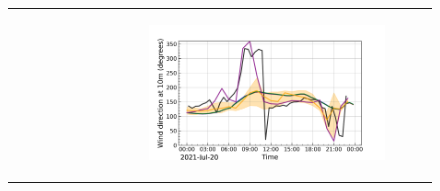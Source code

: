 \begin{figure}[hbtp]
\begin{tabular}{cc}
\begin{subfigure}[t]{0.5\textwidth}
        \end{subfigure} &
        \begin{subfigure}[t]{0.5\textwidth}
            \caption{}
            \includegraphics[width=\textwidth]{images/chap5/IOP_TS/TS_2021-07-20_elsplans_wind_direction_10m.png}
        \end{subfigure} \\
    \end{tabular}
    \caption{}
    \label{fig:iop_days_TS_surfvars_elsplans}
\end{figure}
